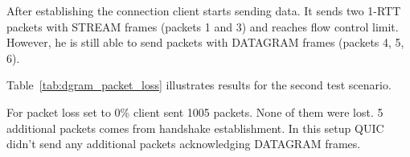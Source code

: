 
After establishing the connection client starts sending data.
It sends two 1-RTT packets with STREAM frames (packets 1 and 3) and reaches flow control limit.
However, he is still able to send packets with DATAGRAM frames (packets 4, 5, 6).


Table~\ref{tab:dgram_packet_loss} illustrates results for the second test scenario.

\begin{table}[h]
    \centering
    \caption{\label{tab:dgram_packet_loss}Number of packets sent with and without packet loss for DATAGRAM frames.}
\end{table}

For packet loss set to 0\% client sent 1005 packets.
None of them were lost.
5 additional packets comes from handshake establishment.
In this setup QUIC didn't send any additional packets acknowledging DATAGRAM frames.

